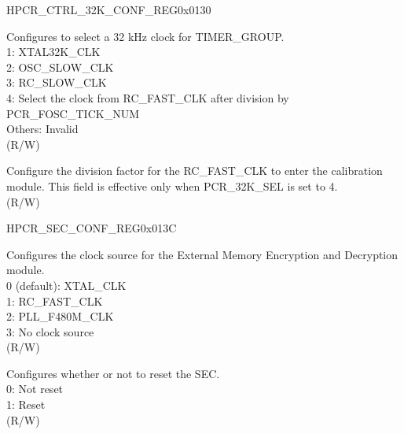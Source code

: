\begin{register}{H}{PCR\_CTRL\_32K\_CONF\_REG}{0x0130}\label{regdesc:PCRCTRL32KCONFREG}
%
%
%
%
\regnewline%
\begin{regdesc}\begin{reglist}
\label{fielddesc:PCR32KSEL}\item [PCR\_32K\_SEL] Configures to select a 32 kHz clock for TIMER\_GROUP.\\
1: XTAL32K\_CLK \\
2: OSC\_SLOW\_CLK \\
3: RC\_SLOW\_CLK \\
4: Select the clock from RC\_FAST\_CLK after division by PCR\_FOSC\_TICK\_NUM\\
Others: Invalid \\ (R/W)
\label{fielddesc:PCRFOSCTICKNUM}\item [PCR\_FOSC\_TICK\_NUM] Configure the division factor for the RC\_FAST\_CLK to enter the calibration module. This field is effective only when PCR\_32K\_SEL is set to 4. \\(R/W)
\end{reglist}\end{regdesc}
\end{register}


\begin{register}{H}{PCR\_SEC\_CONF\_REG}{0x013C}\label{regdesc:PCRSECCONFREG}
%
%
%
\regnewline%
\begin{regdesc}\begin{reglist}
\label{fielddesc:PCRSECCLKSEL}\item [PCR\_SEC\_CLK\_SEL] Configures the clock source for the External Memory Encryption and Decryption module.\\
0 (default): XTAL\_CLK \\
1: RC\_FAST\_CLK \\
2: PLL\_F480M\_CLK \\
3: No clock source \\ (R/W)
\label{fielddesc:PCRSECRSTEN}\item [PCR\_SEC\_RST\_EN] Configures whether or not to reset the SEC.\\
0: Not reset\\
1: Reset\\(R/W)
\end{reglist}\end{regdesc}
\end{register}

